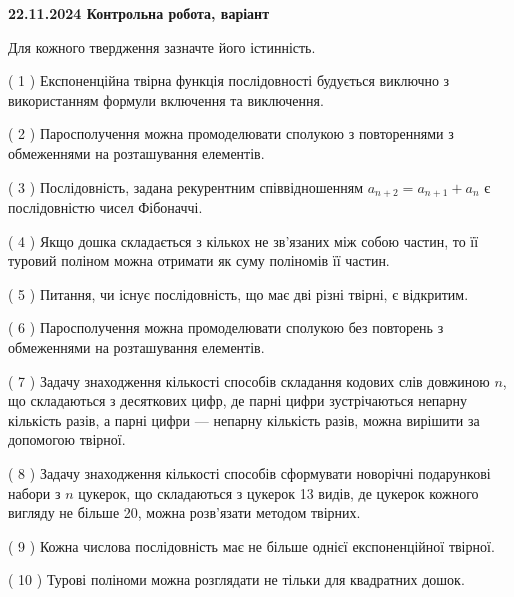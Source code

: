 \documentclass[12pt, ukrainian]{article}
\begin{document}
\vspace{4mm}
\newpage
\begin {large}

\textbf{22.11.2024 Контрольна робота, варіант  }\par


{
Для кожного твердження зазначте його істинність.\par
\vspace{2mm}
( 1 ) Експоненційна твірна функція послідовності будується виключно з використанням формули включення та виключення.%

( 2 ) Паросполучення можна промоделювати сполукою з повтореннями з обмеженнями на розташування елементів.%

( 3 ) Послідовність, задана рекурентним співвідношенням $a_{n+2}=a_{n+1}+a_{n}$ є послідовністю чисел Фібоначчі.%

( 4 ) Якщо дошка складається з кількох не зв’язаних між собою частин, то її туровий поліном можна отримати як суму поліномів її частин.%

( 5 ) Питання, чи існує послідовність, що має дві різні твірні, є відкритим.%

( 6 ) Паросполучення можна промоделювати сполукою без повторень з обмеженнями на розташування елементів.%

( 7 ) Задачу знаходження кількості способів складання кодових слів довжиною $n$, що складаються з десяткових цифр, де парні цифри зустрічаються непарну кількість разів, а парні цифри — непарну кількість разів, можна вирішити за допомогою твірної.%

( 8 ) Задачу знаходження кількості способів сформувати новорічні подарункові набори з $n$ цукерок, що складаються з цукерок 13 видів, де цукерок кожного вигляду не більше 20, можна розв’язати методом твірних.%

( 9 ) Кожна числова послідовність має не більше однієї  експоненційної твірної.%

( 10 ) Турові поліноми можна розглядати не тільки для квадратних дошок.%


\vspace{5mm}
}
\end {large}
\end{document}
